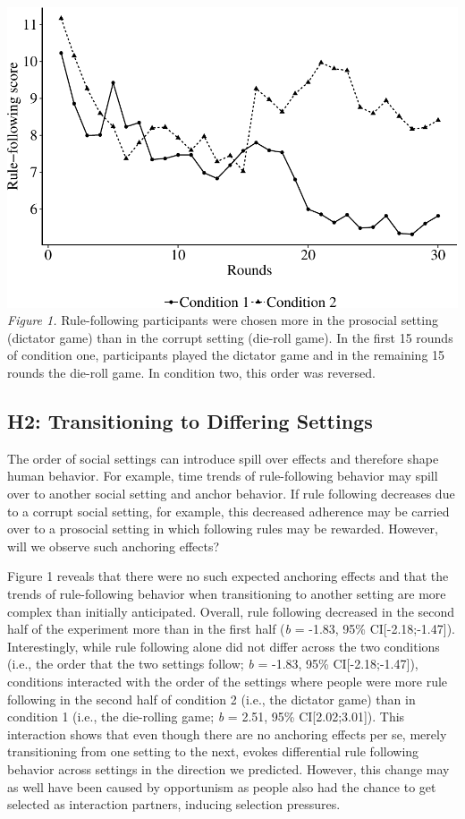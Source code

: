 \documentclass[man]{apa6}
\begin{document}
\includegraphics{Thesis_files/figure-latex/unnamed-chunk-1-1.pdf}
\emph{Figure 1.} Rule-following participants were chosen more in the
prosocial setting (dictator game) than in the corrupt setting (die-roll
game). In the first 15 rounds of condition one, participants played the
dictator game and in the remaining 15 rounds the die-roll game. In
condition two, this order was reversed.

\hypertarget{h2-transitioning-to-differing-settings}{%
\subsection{H2: Transitioning to Differing
Settings}\label{h2-transitioning-to-differing-settings}}

The order of social settings can introduce spill over effects and
therefore shape human behavior. For example, time trends of
rule-following behavior may spill over to another social setting and
anchor behavior. If rule following decreases due to a corrupt social
setting, for example, this decreased adherence may be carried over to a
prosocial setting in which following rules may be rewarded. However,
will we observe such anchoring effects?

Figure 1 reveals that there were no such expected anchoring effects and
that the trends of rule-following behavior when transitioning to another
setting are more complex than initially anticipated. Overall, rule
following decreased in the second half of the experiment more than in
the first half (\emph{b} = -1.83, 95\% CI{[}-2.18;-1.47{]}).
Interestingly, while rule following alone did not differ across the two
conditions (i.e., the order that the two settings follow; \emph{b} =
-1.83, 95\% CI{[}-2.18;-1.47{]}), conditions interacted with the order
of the settings where people were more rule following in the second half
of condition 2 (i.e., the dictator game) than in condition 1 (i.e., the
die-rolling game; \emph{b} = 2.51, 95\% CI{[}2.02;3.01{]}). This
interaction shows that even though there are no anchoring effects per
se, merely transitioning from one setting to the next, evokes
differential rule following behavior across settings in the direction we
predicted. However, this change may as well have been caused by
opportunism as people also had the chance to get selected as interaction
partners, inducing selection pressures.
\end{document}
